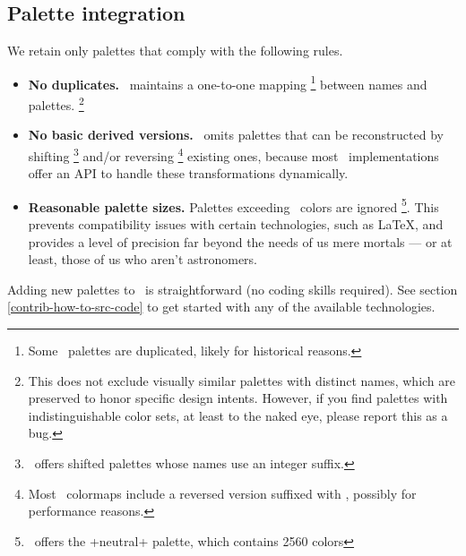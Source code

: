 \documentclass{tutodoc}
\begin{document}

\subsection{Palette integration}

We retain only palettes that comply with the following rules.
%
\begin{itemize}
    \item \textbf{No duplicates.}
    \thisproj\ maintains a one-to-one mapping%
    \footnote{
        Some \matplotlib\ palettes are duplicated, likely for historical reasons.
    }
    between names and palettes.%
    \footnote{
        This does not exclude visually similar palettes with distinct names, which are preserved to honor specific design intents.
        However, if you find palettes with indistinguishable color sets, at least to the naked eye, please report this as a bug.
    }

    \item \textbf{No basic derived versions.}
    \thisproj\ omits palettes that can be reconstructed by shifting%
    \footnote{
        \ offers shifted palettes whose names use an integer suffix.
    }
    and/or reversing%
    \footnote{
        Most \matplotlib\ colormaps include a reversed version suffixed with , possibly for performance reasons.
    }
    existing ones, because most \thisproj\ implementations offer an API to handle these transformations dynamically.


    \item \textbf{Reasonable palette sizes.} 
    Palettes exceeding \palMaxSize\ colors are ignored%
    \footnote{
        \cmasher\ offers the +neutral+ palette, which contains 2560 colors
    }. 
    This prevents compatibility issues with certain technologies, such as \LaTeX, and provides a level of precision far beyond the needs of us mere mortals — or at least, those of us who aren't astronomers.
\end{itemize}




\begin{tdocnote}
    Adding new palettes to \thisproj\ is straightforward (no coding skills required).
    See section \ref{contrib-how-to-src-code} to get started with any of the available technologies.
\end{tdocnote}
\end{document}
